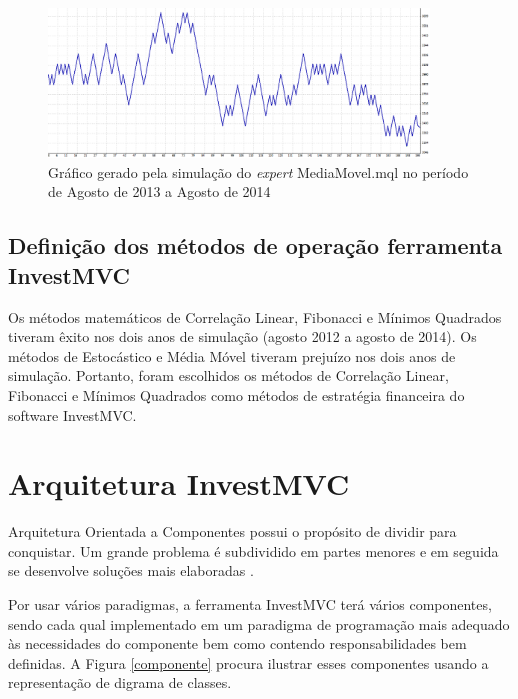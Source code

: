 \begin{figure}[H]
\centering
\includegraphics[width=0.9\textwidth]{figuras/protocoloMedia4}
\caption{ Gráfico gerado pela simulação do \textit{expert} MediaMovel.mql no período de Agosto de 2013 a Agosto de 2014} 
\label{protocoloMedia4}
\end{figure}


\subsection{Definição dos métodos de operação ferramenta InvestMVC}

Os métodos matemáticos de Correlação Linear, Fibonacci e Mínimos Quadrados tiveram êxito nos dois anos de simulação (agosto 2012 a agosto de 2014). Os métodos de Estocástico e Média Móvel tiveram prejuízo nos dois anos de simulação. Portanto, foram escolhidos os métodos de Correlação Linear, Fibonacci e Mínimos Quadrados como métodos de estratégia financeira do software InvestMVC.

\section{Arquitetura InvestMVC}

Arquitetura Orientada a Componentes possui o propósito de dividir para conquistar. Um grande problema é subdividido em partes menores e em seguida se desenvolve soluções mais elaboradas \cite{john}.

Por usar vários paradigmas, a ferramenta InvestMVC terá vários componentes, sendo cada qual implementado em um paradigma de programação mais adequado às necessidades do componente bem como contendo responsabilidades bem definidas. A Figura \ref{componente} procura ilustrar esses componentes usando a representação de digrama de classes.

